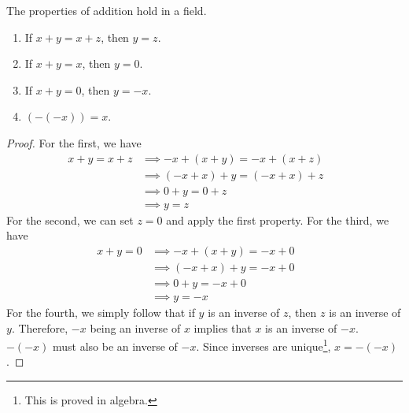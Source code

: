   \begin{lemma}
    The properties of addition hold in a field. 
    \begin{enumerate}
      \item If $x + y = x + z$, then $y = z$. 
      \item If $x + y = x$, then $y = 0$. 
      \item If $x + y = 0$, then $y = -x$. 
      \item $(-(-x)) = x$. 
    \end{enumerate}
  \end{lemma}
  \begin{proof}
    For the first, we have 
    \begin{align}
      x + y = x + z & \implies -x + (x + y) = -x + (x + z) && \tag{addition is a function} \\
                    & \implies (-x + x) + y = (-x + x) + z && \tag{$+$ is associative} \\
                    & \implies 0 + y = 0 + z && \tag{definition of additive inverse} \\
                    & \implies y = z && \tag{definition of identity}
    \end{align} 
    For the second, we can set $z = 0$ and apply the first property. For the third, we have 
    \begin{align}
      x + y = 0 & \implies -x + (x + y) = -x + 0 && \tag{addition is a function} \\
                & \implies (-x + x) + y = -x + 0 && \tag{$+$ is associative} \\
                & \implies 0 + y = -x + 0 && \tag{definition of additive inverse} \\
                & \implies y = -x && \tag{definition of identity}
    \end{align}
    For the fourth, we simply follow that if $y$ is an inverse of $z$, then $z$ is an inverse of $y$. Therefore, $-x$ being an inverse of $x$ implies that $x$ is an inverse of $-x$. $-(-x)$ must also be an inverse of $-x$. Since inverses are unique\footnote{This is proved in algebra.}, $x = -(-x)$. 
  \end{proof}

